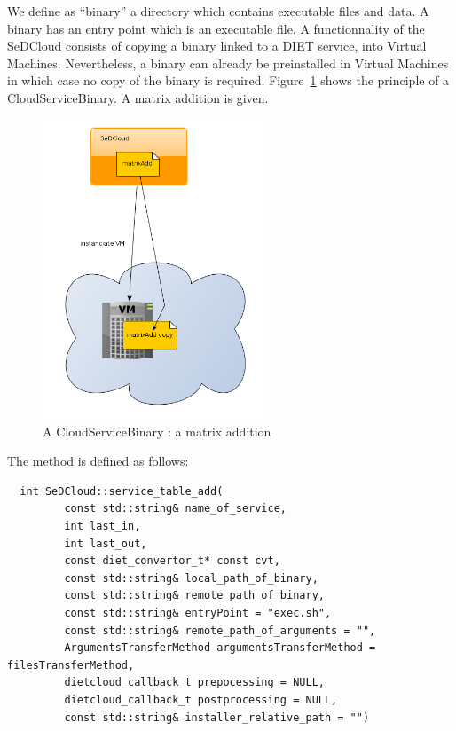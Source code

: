 We define as ``binary'' a directory which contains executable files
and data. A binary has an entry point which is an executable file.  A
functionnality of the SeDCloud consists of copying a binary linked to
a DIET service, into Virtual Machines. Nevertheless, a binary can
already be preinstalled in Virtual Machines in which case no copy of
the binary is required. Figure~\ref{fig:CloudServiceBinary-eg01} shows
the principle of a CloudServiceBinary. A matrix addition is given.

\begin{figure}[h!]
 \begin{center}
 \includegraphics[width=0.6\textwidth]{fig/CloudServiceBinary}
  \caption{A CloudServiceBinary : a matrix addition}
  \label{fig:CloudServiceBinary-eg01}
 \end{center}
\end{figure}




The method is defined as follows:

\begin{verbatim}
  int SeDCloud::service_table_add(
         const std::string& name_of_service,
         int last_in,
         int last_out,
         const diet_convertor_t* const cvt,
         const std::string& local_path_of_binary,
         const std::string& remote_path_of_binary,
         const std::string& entryPoint = "exec.sh",
         const std::string& remote_path_of_arguments = "",
         ArgumentsTransferMethod argumentsTransferMethod = filesTransferMethod,
         dietcloud_callback_t prepocessing = NULL,
         dietcloud_callback_t postprocessing = NULL,
         const std::string& installer_relative_path = "")
\end{verbatim}

